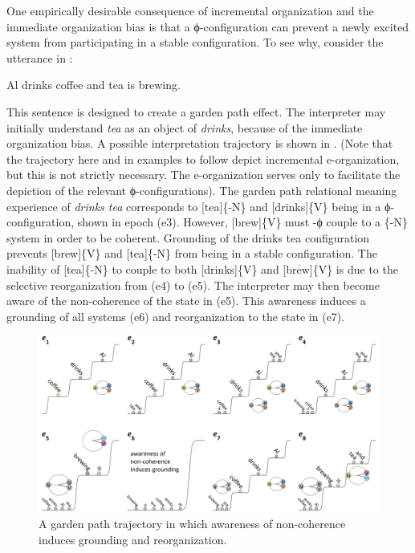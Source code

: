   One empirically desirable consequence of incremental organization and the immediate organization bias is that a ϕ-configuration can prevent a newly excited system from participating in a stable configuration. To see why, consider the utterance in : 

\ea\label{ex:6:12}
Al drinks coffee and tea is brewing.
\z   

  This sentence is designed to create a garden path effect. The interpreter may initially understand \textit{tea} as an object of \textit{drinks}, because of the immediate organization bias. A possible interpretation trajectory is shown in {}. (Note that the trajectory here and in examples to follow depict incremental e-organization, but this is not strictly necessary. The e-organization serves only to facilitate the depiction of the relevant ϕ-configurations). The garden path relational meaning experience of \textit{drinks tea} corresponds to [tea]\{-N\} and [drinks]\{V\} being in a ϕ-configuration, shown in epoch (e3).  However, [brew]\{V\} must -ϕ couple to a \{-N\} system in order to be coherent. Grounding of the {\textbar}drinks tea{\textbar} configuration prevents [brew]\{V\} and [tea]\{-N\} from being in a stable configuration. The inability of [tea]\{-N\} to couple to both [drinks]\{V\} and [brew]\{V\} is due to the selective reorganization from (e4) to (e5). The interpreter may then become aware of the non-coherence of the state in (e5). This awareness induces a grounding of all systems (e6) and reorganization to the state in (e7). 

  
\begin{figure}
\includegraphics[width=\textwidth]{figures/Tilsen-img130.png}
\caption{A garden path trajectory in which awareness of non-coherence induces grounding and reorganization.}
\label{fig:6:11}
\end{figure}
 


